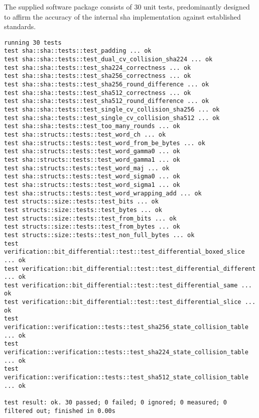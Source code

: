 The supplied software package consists of 30 unit tests, predominantly designed to affirm the accuracy of the internal sha implementation against established standards.

\begin{lstlisting}[caption={\texttt{cargo test} Results Output}]
running 30 tests
test sha::sha::tests::test_padding ... ok
test sha::sha::tests::test_dual_cv_collision_sha224 ... ok
test sha::sha::tests::test_sha224_correctness ... ok
test sha::sha::tests::test_sha256_correctness ... ok
test sha::sha::tests::test_sha256_round_difference ... ok
test sha::sha::tests::test_sha512_correctness ... ok
test sha::sha::tests::test_sha512_round_difference ... ok
test sha::sha::tests::test_single_cv_collision_sha256 ... ok
test sha::sha::tests::test_single_cv_collision_sha512 ... ok
test sha::sha::tests::test_too_many_rounds ... ok
test sha::structs::tests::test_word_ch ... ok
test sha::structs::tests::test_word_from_be_bytes ... ok
test sha::structs::tests::test_word_gamma0 ... ok
test sha::structs::tests::test_word_gamma1 ... ok
test sha::structs::tests::test_word_maj ... ok
test sha::structs::tests::test_word_sigma0 ... ok
test sha::structs::tests::test_word_sigma1 ... ok
test sha::structs::tests::test_word_wrapping_add ... ok
test structs::size::tests::test_bits ... ok
test structs::size::tests::test_bytes ... ok
test structs::size::tests::test_from_bits ... ok
test structs::size::tests::test_from_bytes ... ok
test structs::size::tests::test_non_full_bytes ... ok
test verification::bit_differential::test::test_differential_boxed_slice ... ok
test verification::bit_differential::test::test_differential_different ... ok
test verification::bit_differential::test::test_differential_same ... ok
test verification::bit_differential::test::test_differential_slice ... ok
test verification::verification::tests::test_sha256_state_collision_table ... ok
test verification::verification::tests::test_sha224_state_collision_table ... ok
test verification::verification::tests::test_sha512_state_collision_table ... ok

test result: ok. 30 passed; 0 failed; 0 ignored; 0 measured; 0 filtered out; finished in 0.00s
\end{lstlisting}
